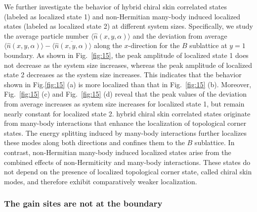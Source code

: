 \documentclass[longbibliography, aps, prx, amsmath, amssymb, amsfonts, twocolumn,superscriptaddress, footinbib]{revtex4-1}
\begin{document}
	We further investigate the behavior of hybrid chiral skin correlated states (labeled as localized state 1) and non-Hermitian many-body induced localized states (labeled as localized state 2) at different system sizes. Specifically, we study the average particle number $\langle \hat{n}(x, y, \alpha) \rangle$ and the deviation from average $\langle \hat{n}(x, y, \alpha) \rangle - \overline{\langle \hat{n}(x, y, \alpha) \rangle}$ along the $x$-direction for the $B$ sublattice at $y = 1$ boundary.
	As shown in Fig.~\ref{fig:15}, the peak amplitude of localized state 1 does not decrease as the system size increases, whereas the peak amplitude of localized state 2 decreases as the system size increases. This indicates that the behavior shown in Fig.\ref{fig:15} (a) is more localized than that in Fig.~\ref{fig:15} (b).
	Moreover, Fig.~\ref{fig:15} (c) and Fig.~\ref{fig:15} (d) reveal that the peak values of the deviation from average increases as system size increases for localized state 1, but remain nearly constant for localized state 2.
	hybrid chiral skin correlated states originate from many-body interactions that enhance the localization of topological corner states. 
	The energy splitting induced by many-body interactions further localizes these modes along both directions and confines them to the $B$ sublattice.
	In contrast, non-Hermitian many-body induced localized states arise from the combined effects of non-Hermiticity and many-body interactions. These states do not depend on the presence of localized topological corner state, called chiral skin modes, and therefore exhibit comparatively weaker localization.

	\subsubsection{The gain sites are not at the boundary}

\end{document}
